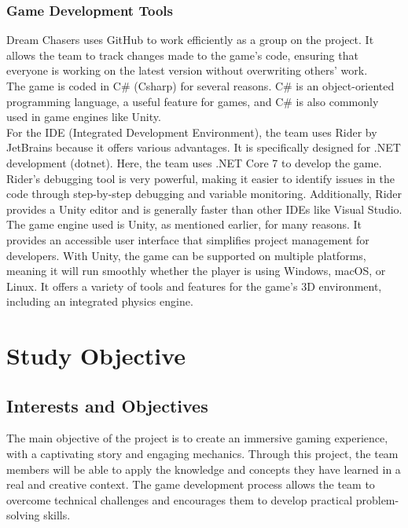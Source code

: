 \documentclass{article}
\begin{document}
\subsubsection{Game Development Tools}\hfill

Dream Chasers uses GitHub to work efficiently as a group on the project. It allows the team to track changes made to the game's code, ensuring that everyone is working on the latest version without overwriting others' work.\\

The game is coded in C\# (Csharp) for several reasons. C\# is an object-oriented programming language, a useful feature for games, and C\# is also commonly used in game engines like Unity.\\

For the IDE (Integrated Development Environment), the team uses Rider by JetBrains because it offers various advantages. It is specifically designed for .NET development (dotnet). Here, the team uses .NET Core 7 to develop the game. Rider’s debugging tool is very powerful, making it easier to identify issues in the code through step-by-step debugging and variable monitoring. Additionally, Rider provides a Unity editor and is generally faster than other IDEs like Visual Studio.\\

The game engine used is Unity, as mentioned earlier, for many reasons. It provides an accessible user interface that simplifies project management for developers. With Unity, the game can be supported on multiple platforms, meaning it will run smoothly whether the player is using Windows, macOS, or Linux. It offers a variety of tools and features for the game’s 3D environment, including an integrated physics engine.
















\newpage
\section{Study Objective}
\subsection{Interests and Objectives}\hfill

The main objective of the project is to create an immersive gaming experience, with a captivating story and engaging mechanics. Through this project, the team members will be able to apply the knowledge and concepts they have learned in a real and creative context. The game development process allows the team to overcome technical challenges and encourages them to develop practical problem-solving skills.
\end{document}
